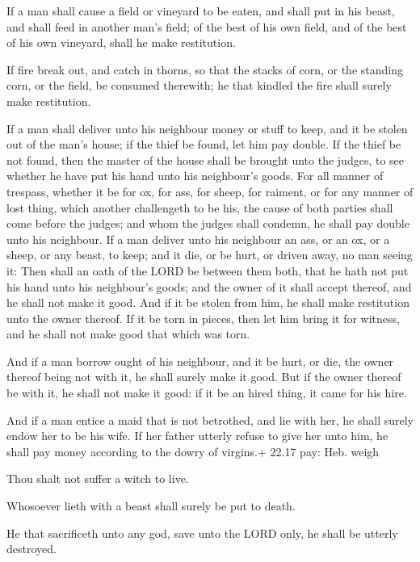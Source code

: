  If a man shall cause a field or vineyard to be eaten, and
shall put in his beast, and shall feed in another man's field; of the
best of his own field, and of the best of his own vineyard, shall he
make restitution.

 If fire break out, and catch in thorns, so that the
stacks of corn, or the standing corn, or the field, be consumed
therewith; he that kindled the fire shall surely make restitution.

 If a man shall deliver unto his neighbour money or stuff
to keep, and it be stolen out of the man's house; if the thief be found,
let him pay double.  If the thief be not found, then the
master of the house shall be brought unto the judges, to see whether he
have put his hand unto his neighbour's goods.  For all
manner of trespass, whether it be for ox, for ass, for sheep, for
raiment, or for any manner of lost thing, which another challengeth to
be his, the cause of both parties shall come before the judges; and whom
the judges shall condemn, he shall pay double unto his neighbour.
 If a man deliver unto his neighbour an ass, or an ox, or a
sheep, or any beast, to keep; and it die, or be hurt, or driven away, no
man seeing it:  Then shall an oath of the LORD be between
them both, that he hath not put his hand unto his neighbour's goods; and
the owner of it shall accept thereof, and he shall not make it good.
 And if it be stolen from him, he shall make restitution
unto the owner thereof.  If it be torn in pieces, then let
him bring it for witness, and he shall not make good that which was
torn.

 And if a man borrow ought of his neighbour, and it be
hurt, or die, the owner thereof being not with it, he shall surely make
it good.  But if the owner thereof be with it, he shall not
make it good: if it be an hired thing, it came for his hire.

 And if a man entice a maid that is not betrothed, and
lie with her, he shall surely endow her to be his wife.  If
her father utterly refuse to give her unto him, he shall pay money
according to the dowry of virgins.+ 22.17 pay: Heb. weigh

 Thou shalt not suffer a witch to live.

 Whosoever lieth with a beast shall surely be put to
death.

 He that sacrificeth unto any god, save unto the LORD
only, he shall be utterly destroyed.

